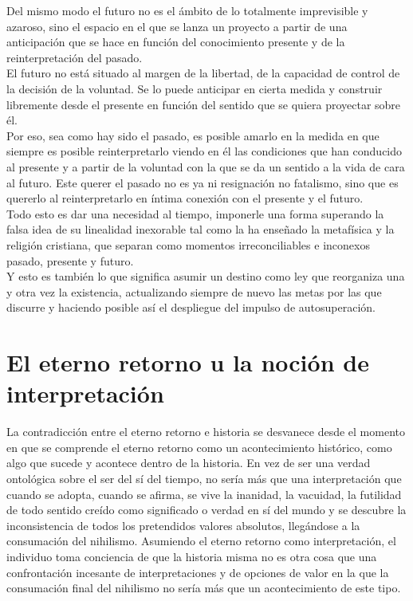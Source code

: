 \documentclass[a4paper, 10pt, twocolumn, spanish]{article}
\begin{document}
Del mismo modo el futuro no es el ámbito de lo totalmente imprevisible
y azaroso, sino el espacio en el que se lanza un proyecto a partir de
una anticipación que se hace en función del conocimiento presente y de
la reinterpretación del pasado.\\[0pt]
El futuro no está situado al margen de la libertad, de la capacidad de
control de la decisión de la voluntad. Se lo puede anticipar en cierta
medida y construir libremente desde el presente en función del sentido
que se quiera proyectar sobre él.\\[0pt]

Por eso, sea como hay sido el pasado, es posible amarlo en la medida
en que siempre es posible reinterpretarlo viendo en él las condiciones
que han conducido al presente y a partir de la voluntad con la que se
da un sentido a la vida de cara al futuro. Este querer el pasado no es
ya ni resignación no fatalismo, sino que es quererlo al
reinterpretarlo en íntima conexión con el presente y el futuro.\\[0pt]

Todo esto es dar una necesidad al tiempo, imponerle una forma
superando la falsa idea de su linealidad inexorable tal como la ha
enseñado la metafísica y la religión cristiana, que separan como
momentos irreconciliables e inconexos pasado, presente y futuro.\\[0pt]
Y esto es también lo que significa asumir un destino como ley que
reorganiza una y otra vez la existencia, actualizando siempre de nuevo
las metas por las que discurre y haciendo posible así el despliegue
del impulso de autosuperación.

\section{El eterno retorno u la noción de interpretación}
\label{sec:org4bcbb8a}
La contradicción entre el eterno retorno e historia se desvanece desde
el momento en que se comprende el eterno retorno como un
acontecimiento histórico, como algo que sucede y acontece dentro de la
historia. En vez de ser una verdad ontológica sobre el ser del sí del
tiempo, no sería más que una interpretación que cuando se adopta,
cuando se afirma, se vive la inanidad, la vacuidad, la futilidad de
todo sentido creído como significado o verdad en sí del mundo y se
descubre la inconsistencia de todos los pretendidos valores absolutos,
llegándose a la consumación del nihilismo. Asumiendo el eterno retorno
como interpretación, el individuo toma conciencia de que la historia
misma no es otra cosa que una confrontación incesante de
interpretaciones y de opciones de valor en la que la consumación final
del nihilismo no sería más que un acontecimiento de este tipo.\\[0pt]
\end{document}
